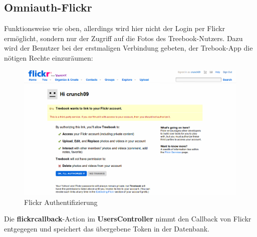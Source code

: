 \documentclass[10pt,a4paper]{book}
\makeatletter
\def\ScaleIfNeeded{%
\ifdim\Gin@nat@width>\linewidth
\linewidth
\else
\Gin@nat@width
\fi
}
\makeatother
\begin{document}
\subsection{Omniauth-Flickr}
Funktionsweise wie oben, allerdings wird hier nicht der Login per Flickr ermöglicht, sondern nur der Zugriff auf die Fotos des Treebook-Nutzers. Dazu wird der Benutzer bei der erstmaligen Verbindung gebeten, der Trebook-App die nötigen Rechte einzuräumen:
\begin{figure}[htbp]
\centering
\includegraphics[width=\ScaleIfNeeded]{Pictures/screen_flickr_auth.png}%
\caption{Flickr Authentifizierung}%
\end{figure}
Die \textbf{flickrcallback}-Action im \textbf{UsersController} nimmt den Callback von Flickr entgegegen und speichert das übergebene Token in der Datenbank.
\end{document}
